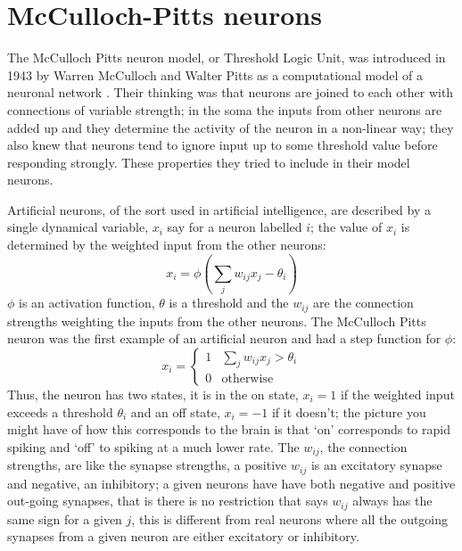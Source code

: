 \documentclass[12pt]{article}
\begin{document}
\section*{McCulloch-Pitts neurons} 

The McCulloch Pitts neuron model, or Threshold Logic Unit, was
introduced in 1943 by Warren McCulloch and Walter Pitts as a
computational model of a neuronal network \cite{McCullochPitts1943}. Their thinking was that
neurons are joined to each other with connections of variable
strength; in the soma the inputs from other neurons are added up and
they determine the activity of the neuron in a non-linear way; they
also knew that neurons tend to ignore input up to some threshold value
before responding strongly. These properties they tried to include in
their model neurons.

Artificial neurons, of the sort used in artificial intelligence, are
described by a single dynamical variable, $x_i$ say for a neuron
labelled $i$; the value of $x_i$ is determined by the weighted input
from the other neurons:
\begin{equation}
x_i=\phi\left(\sum_j w_{ij} x_j-\theta_i\right)
\end{equation}
$\phi$ is an activation function, $\theta$ is a threshold and the
$w_{ij}$ are the connection strengths weighting the inputs from the
other neurons. The McCulloch Pitts neuron was the first example of an
artificial neuron and had a step function for $\phi$:
\begin{equation}
x_i=\left\{\begin{array}{ll}1&\sum_j w_{ij} x_j>\theta_i\\0&\mbox{otherwise}\end{array}\right.
\end{equation}
Thus, the neuron has two states, it is in the on state, $x_i=1$ if the
weighted input exceeds a threshold $\theta_i$ and an off state,
$x_i=-1$ if it doesn't; the picture you might have of how this
corresponds to the brain is that \lq{}on\rq{} corresponds to rapid
spiking and \lq{}off\rq{} to spiking at a much lower rate. The
$w_{ij}$, the connection strengths, are like the synapse strengths, a
positive $w_{ij}$ is an excitatory synapse and negative, an
inhibitory; a given neurons have have both negative and positive
out-going synapses, that is there is no restriction that says $w_{ij}$
always has the same sign for a given $j$, this is different from real
neurons where all the outgoing synapses from a given neuron are either
excitatory or inhibitory.
\end{document}
